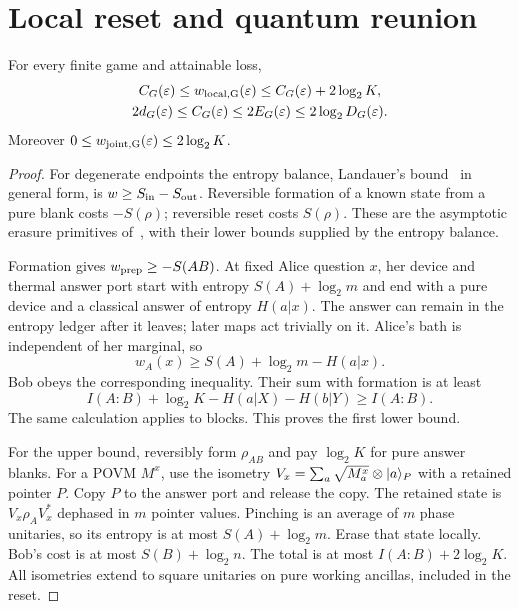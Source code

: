 \section{Local reset and quantum reunion}\label{sec:local}
\begin{theorem}\label{thm:local}
For every finite game and attainable loss,
\begin{gather}
 C_G(\varepsilon)\le w_{\rm local,G}(\varepsilon)\le C_G(\varepsilon)+2\log_2K,\label{eq:local}\\
 2d_G(\varepsilon)\le C_G(\varepsilon)\le2E_G(\varepsilon)\le2\log_2D_G(\varepsilon).
 \label{eq:sandwich}
\end{gather}
Moreover $0\le w_{\rm joint,G}(\varepsilon)\le2\log_2K$.
\end{theorem}
\begin{proof}
For degenerate endpoints the entropy balance, Landauer's bound~\cite{landauer} in general form, is $w\ge S_{\rm in}-S_{\rm out}$. Reversible formation of a known state from a pure blank costs $-S(\rho)$; reversible reset costs $S(\rho)$. These are the asymptotic erasure primitives of~\cite[Corollary 2 and Appendix D]{delrio}, with their lower bounds supplied by the entropy balance.

Formation gives $w_{\rm prep}\ge-S(AB)$. At fixed Alice question $x$, her device and thermal answer port start with entropy $S(A)+\log_2m$ and end with a pure device and a classical answer of entropy $H(a|x)$. The answer can remain in the entropy ledger after it leaves; later maps act trivially on it. Alice's bath is independent of her marginal, so
\[
 w_A(x)\ge S(A)+\log_2m-H(a|x).
\]
Bob obeys the corresponding inequality. Their sum with formation is at least
\[
 I(A:B)+\log_2K-H(a|X)-H(b|Y)\ge I(A:B).
\]
The same calculation applies to blocks. This proves the first lower bound.

For the upper bound, reversibly form $\rho_{AB}$ and pay $\log_2K$ for pure answer blanks. For a POVM $M^x$, use the isometry $V_x=\sum_a\sqrt{M_a^x}\otimes|a\rangle_P$ with a retained pointer $P$. Copy $P$ to the answer port and release the copy. The retained state is $V_x\rho_AV_x^*$ dephased in $m$ pointer values. Pinching is an average of $m$ phase unitaries, so its entropy is at most $S(A)+\log_2m$. Erase that state locally. Bob's cost is at most $S(B)+\log_2n$. The total is at most $I(A:B)+2\log_2K$. All isometries extend to square unitaries on pure working ancillas, included in the reset.


\end{proof}
